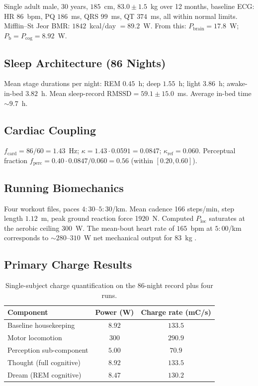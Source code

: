 \documentclass[11pt,twocolumn,a4paper]{article}
\theoremstyle{definition}
\theoremstyle{remark}
\newcommand{\Pb}{P_{\mathrm{b}}}
\newcommand{\Pbrain}{P_{\mathrm{brain}}}
\newcommand{\Pcog}{P_{\mathrm{cog}}}
\newcommand{\fcard}{f_{\mathrm{card}}}
\newcommand{\RMSSD}{\mathrm{RMSSD}}
\begin{document}
Single adult male, 30 years, $185$~cm, $83.0 \pm 1.5$~kg over 12
months, baseline ECG: HR $86$~bpm, PQ $186$~ms, QRS $99$~ms, QT
$374$~ms, all within normal limits. Mifflin--St Jeor BMR:
$1842$~kcal/day $= 89.2$~W. From this: $\Pbrain = 17.8$~W; $\Pb =
\Pcog = 8.92$~W.

\subsection{Sleep Architecture (86 Nights)}

Mean stage durations per night:
REM $0.45$~h; deep $1.55$~h; light $3.86$~h; awake-in-bed $3.82$~h.
Mean sleep-record $\RMSSD = 59.1 \pm 15.0$~ms. Average in-bed time
$\sim 9.7$~h.

\subsection{Cardiac Coupling}

$\fcard = 86/60 = 1.43$~Hz; $\kappa = 1.43 \cdot 0.0591 = 0.0847$;
$\kappa_{\mathrm{ref}} = 0.060$. Perceptual fraction
$f_{\mathrm{perc}} = 0.40 \cdot 0.0847/0.060 = 0.56$ (within
$[0.20, 0.60]$).

\subsection{Running Biomechanics}

Four workout files, paces $4{:}30$--$5{:}30$/km. Mean cadence 166
steps/min, step length $1.12$~m, peak ground reaction force 1920~N.
Computed $P_{\mathrm{loc}}$ saturates at the aerobic ceiling 300~W.
The mean-bout heart rate of $165$~bpm at $5{:}00$/km corresponds to
$\sim 280$--$310$~W net mechanical output for $83$~kg
\citep{jones2011}.

\subsection{Primary Charge Results}

\begin{table}[H]
\centering
\small
\begin{tabular}{lcc}
\toprule
\textbf{Component} & \textbf{Power (W)} & \textbf{Charge rate (mC/s)} \\
\midrule
Baseline housekeeping & $8.92$ & $133.5$ \\
Motor locomotion & $300$ & $290.9$ \\
Perception sub-component & $5.00$ & $70.9$ \\
Thought (full cognitive) & $8.92$ & $133.5$ \\
Dream (REM cognitive) & $8.47$ & $130.2$ \\
\bottomrule
\end{tabular}
\caption{Single-subject charge quantification on the 86-night record
plus four runs.}
\label{tab:results}
\end{table}
\end{document}
